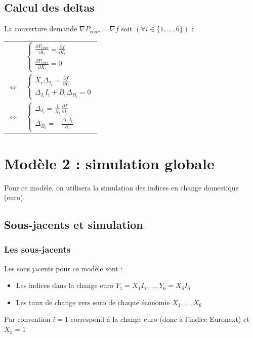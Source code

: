 \documentclass[a4paper,12pt]{article}
\begin{document}
\subsection{Calcul des deltas}
La couverture demande $\nabla P_{couv}=\nabla f$ soit $\left(\forall i\in\{1,\ldots,6\}\right)$ : 
\begin{center}
\begin{tabular}{cl}
& $ \begin{cases}
\frac{\partial P_{couv}}{\partial I_i} = \frac{\partial f}{\partial I_i} \\
\frac{\partial P_{couv}}{\partial X_i} = 0
\end{cases}
$ \\[2mm]
$\Leftrightarrow$ & $ \begin{cases}
X_i\Delta_{I_i} = \frac{\partial f}{\partial I_i} \\
\Delta_{I_i}I_i+B_i\Delta_{B_i} = 0
\end{cases}
$ \\[1mm]
$\Leftrightarrow$ & $ \begin{cases}
\Delta_{I_i} = \frac{1}{X_i}\frac{\partial f}{\partial I_i} \\
\Delta_{B_i} = -\frac{\Delta_{I_i}I_i}{B_i}
\end{cases}
$
\end{tabular}
\end{center}
\newpage
\section{Modèle 2 : simulation globale}
Pour ce modèle, on utilisera la simulation des indices en change domestique (euro).
\subsection{Sous-jacents et simulation}
\subsubsection{Les sous-jacents}
Les sous jacents pour ce modèle sont : 
\begin{itemize}[label=$\star$]
\item Les indices dans la change euro $Y_1=X_1I_1,\ldots,Y_6=X_6I_6$
\item Les taux de change vers euro de chaque économie $X_1,\ldots,X_6$
\end{itemize}
Par convention $i=1$ correspond à la change euro (donc à l'indice Euronext) et $X_1=1$
\end{document}
